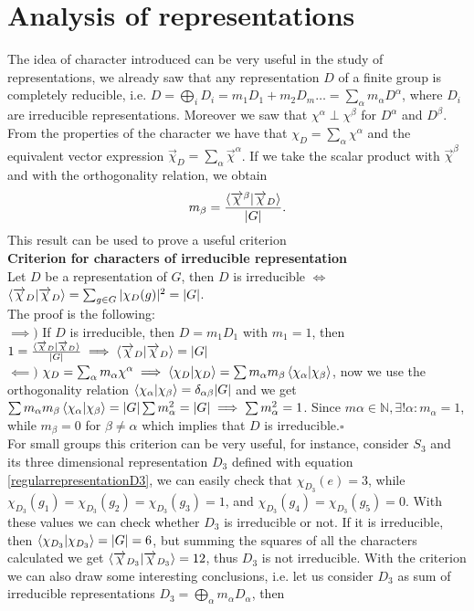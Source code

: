 \documentclass[12pt]{book}
\theoremstyle{plain}
\theoremstyle{definition}
\theoremstyle{remark}
\begin{document}
\section{Analysis of representations}
The idea of character introduced can be very useful in the study of representations, we already saw that any representation $D$ of a finite group is completely reducible, i.e. $D = \bigoplus_i D_i = m_1 D_1 + m_2D_m \dots = \sum_\alpha m_\alpha D^\alpha$, where $D_i$ are irreducible representations. Moreover we saw that $\chi^\alpha \perp \chi^\beta$ for $D^\alpha$ and $D^\beta$. From the properties of the character we have that $\chi_D =\sum_\alpha \chi^\alpha$ and the equivalent vector expression $\overrightarrow{\chi}_D =\sum_\alpha \overrightarrow{\chi}^\alpha$. If we take the scalar product with $\overrightarrow{\chi}^\beta$ and with the orthogonality relation, we obtain
\[m_\beta = \frac{\braket{\overrightarrow{\chi}^\beta|\overrightarrow{\chi}_D}}{|G|}.\]
This result can be used to prove a useful criterion\\
\textbf{Criterion for characters of irreducible representation}\\Let $D$ be a representation of $G$, then $D$ is irreducible $\iff$ $\braket{\overrightarrow{\chi}_{D}|\overrightarrow{\chi}_{D}} = \sum_{g\in G}|\chi_D(g)|^2 = |G|$.\\ The proof is the following:\\
$\implies)$ If $D$ is irreducible, then $D = m_1 D_1$ with $m_1= 1$, then $1 = \frac{\braket{\overrightarrow{\chi}_D|\overrightarrow{\chi}_D}}{|G|} \implies \braket{\overrightarrow{\chi}_D|\overrightarrow{\chi}_D} = |G|$\\
$\impliedby)$ $\chi_D = \sum_\alpha m_\alpha\chi^\alpha \implies \braket{\chi_D|\chi_D} = \sum m_\alpha m_\beta \braket{\chi_\alpha|\chi_\beta}$, now we use the orthogonality relation $\braket{\chi_\alpha|\chi_\beta} = \delta_{\alpha\beta}|G|$ and we get $\sum m_\alpha m_\beta \braket{\chi_\alpha|\chi_\beta} = |G| \sum m_\alpha^2 = |G| \implies \sum m_\alpha^2 = 1$. Since $m\alpha\in \mathbb{N}, \exists! \alpha : m_\alpha = 1$, while $m_\beta = 0 $ for $\beta\neq \alpha$ which implies that $D$ is irreducible.\hfill\ensuremath{\square}\\
For small groups this criterion can be very useful, for instance, consider $S_3$ and its three dimensional representation $D_3$ defined with equation \eqref{regularrepresentationD3}, we can easily check that $\chi_{D_3}(e) = 3$, while $\chi_{D_3}(g_1) = \chi_{D_3}(g_2) = \chi_{D_3}(g_3)=1$, and $\chi_{D_3}(g_4) = \chi_{D_3}(g_5) = 0$. With these values we can check whether $D_3$ is irreducible or not. If it is irreducible, then $\braket{\chi_{D_3}|\chi_{D_3}} = |G| = 6$, but summing the squares of all the characters calculated we get $\braket{\overrightarrow{\chi}_{D_3}|\overrightarrow{\chi}_{D_3}} = 12$, thus $D_3$ is not irreducible. With the criterion we can also draw some interesting conclusions, i.e. let us consider $D_3$ as sum of irreducible representations $D_3 = \bigoplus_\alpha m_\alpha D_\alpha$, then
\end{document}

